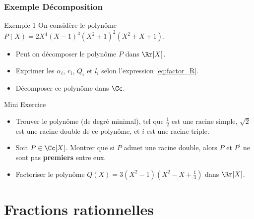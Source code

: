 \documentclass{beamer}
\begin{document}
\begin{frame}[t]
  \frametitle{Exemple Décomposition}

  \begin{block}{Exemple 1}
    \small
     On considère le polynôme $P(X) = 2X^4(X-1)^3(X^2+1)^2(X^2 + X + 1)$.
     \begin{itemize}
       \item Peut on décomposer le polynôme $P$ dans $\Rr[X]$.
       \item Exprimer les $\alpha_i$, $r_i$, $Q_i$ et $l_i$ selon l'expression
         \eqref{eq:factor_R}.
       \item Décomposer ce polynôme dans $\Cc$.

     \end{itemize}
   \end{block}
     \pause
     \begin{block}{Mini Exercice}
       \begin{itemize}
         \small
       \item Trouver le polynôme (\alert{de degré minimal}), tel que
         $\frac{1}{2}$ est une racine simple, $\sqrt{2}$ est une racine double
         de ce polynôme, et $i$ est une racine triple.\\[4pt]
       \item Soit $P \in \Cc[X]$. Montrer que si $P$ admet une racine double,
         alors $P$ et $P^{'}$ ne sont pas \textbf{premiers} entre eux.\\[4pt]
       \item Factoriser  le polynôme $Q(X) = 3(X^2-1)(X^2-X+\frac{1}{4})$ dans
         $\Rr[X]$.
       \end{itemize}
  \end{block}
  
\end{frame}

\section{Fractions rationnelles}%
\label{sec:fractions_rationnelles}



\end{document}
